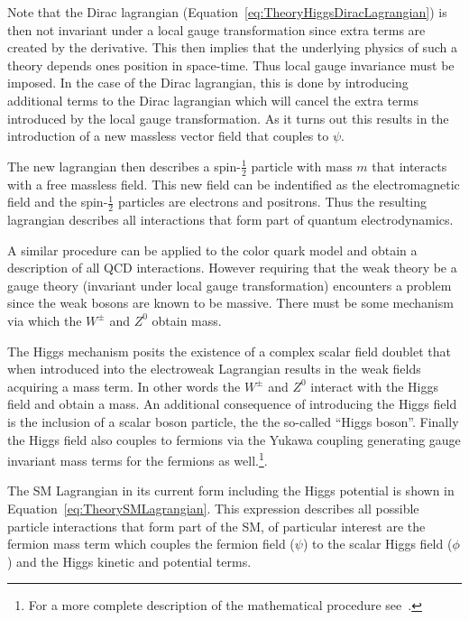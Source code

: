Note that the Dirac lagrangian (Equation~\ref{eq:TheoryHiggsDiracLagrangian}) is then not invariant under a local gauge transformation since extra terms are created by the derivative. This then implies that the underlying physics of such a theory depends ones position in space-time. Thus local gauge invariance must be imposed. In the case of the Dirac lagrangian, this is done by introducing additional terms to the Dirac lagrangian which will cancel the extra terms introduced by the local gauge transformation. As it turns out this results in the introduction of a new massless vector field that couples to $\psi$.

The new lagrangian then describes a spin-$\frac{1}{2}$ particle with mass $m$ that interacts with a free massless field. This new field can be indentified as the electromagnetic field and the spin-$\frac{1}{2}$ particles are electrons and positrons. Thus the resulting lagrangian describes all interactions that form part of quantum electrodynamics.

A similar procedure can be applied to the color quark model and obtain a description of all QCD interactions. However requiring that the weak theory be a gauge theory (invariant under local gauge transformation) encounters a problem since the weak bosons are known to be massive. There must be some mechanism via which the $W^{\pm}$ and $Z^0$ obtain mass.

The Higgs mechanism posits the existence of a complex scalar field doublet that when introduced into the electroweak Lagrangian results in the weak fields acquiring a mass term. In other words the $W^{\pm}$ and $Z^{0}$ interact with the Higgs field and obtain a mass. An additional consequence of introducing the Higgs field is the inclusion of a scalar boson particle, the the so-called ``Higgs boson''. Finally the Higgs field also couples to fermions via the Yukawa coupling generating gauge invariant mass terms for the fermions as well.\footnote{For a more complete description of the mathematical procedure see~\cite{Theory:IntroGriffiths}.}.

The SM Lagrangian in its current form including the Higgs potential is shown in Equation~\ref{eq:TheorySMLagrangian}. This expression describes all possible particle interactions that form part of the SM, of particular interest are the fermion mass term which couples the fermion field ($\psi$) to the scalar Higgs field ($\phi$) and the Higgs kinetic and potential terms.

